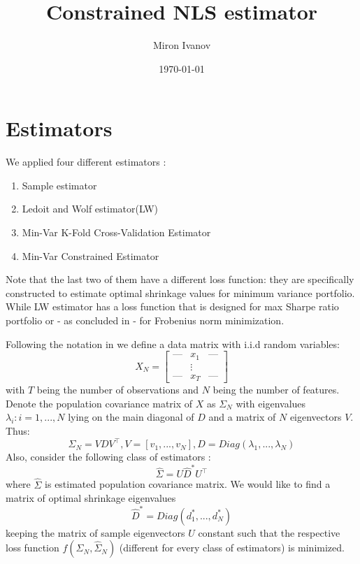 \documentclass{article}
\title{Constrained NLS estimator}
\author{Miron Ivanov }
\date{\today}
\begin{document}
\maketitle

\section{Estimators}

We applied four different estimators : 

\begin{enumerate}
\item Sample estimator
\item Ledoit and Wolf estimator(LW)
\item Min-Var K-Fold Cross-Validation Estimator
\item Min-Var Constrained Estimator
\end{enumerate}

Note that the last two of them have a different loss function: they are specifically constructed to estimate optimal shrinkage values for minimum variance portfolio. While LW estimator has a loss function that is designed for max Sharpe ratio portfolio or -  as concluded in  - for Frobenius norm minimization.

Following the notation in  we define a data matrix with i.i.d random variables: 
$$ 
	X_N = \begin{bmatrix} 
					\text{---} & x_1    & \text{---} \\
					           & \vdots &            \\
					\text{---} & x_T    & \text{---}
				\end{bmatrix}
$$
with $T$ being the number of observations and $N$ being the number of features. Denote the population covariance matrix of $X$ as $\Sigma_N$ with eigenvalues $\lambda_i : i=1,...,N$ lying on the main diagonal of $D$ and a matrix of $N$ eigenvectors $V$. Thus: 
$$
\Sigma_N = VDV^\intercal, V = [v_1,...,v_N], D=Diag(\lambda_1,...,\lambda_N)
$$
Also, consider the following class of estimators : 
$$
\hat{\Sigma} = U\hat{D}^*U^\intercal
$$ where $\hat{\Sigma}$ is estimated population covariance matrix. We would like to find a matrix of optimal shrinkage eigenvalues $$\hat{D}^* = Diag(d^*_1,...,d^*_N)$$ keeping the matrix of sample eigenvectors $U$ constant such that the respective loss function $f(\Sigma_N,\hat{\Sigma}_N)$ (different for every class of estimators) is minimized.
\end{document}
